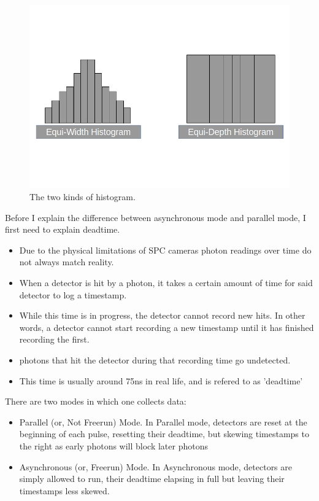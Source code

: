 \documentclass[aspectratio=169]{beamer}
\begin{document}
\begin{frame}
  \begin{figure}[H]
    \centering
    \includegraphics[width=0.75\linewidth]{Histograms.png}
    \caption{\label{fig:Data}\color{Blue}The two kinds of histogram.}
  \end{figure}
\end{frame}

\begin{frame}
  Before I explain the difference between asynchronous mode and parallel mode, I first need to explain deadtime.
  \begin{itemize}
    \color{Blue}
  \item Due to the physical limitations of SPC cameras photon readings over time do not always match reality.
  \item When a detector is hit by a photon, it takes a certain amount of time for said detector to log a timestamp.
  \item While this time is in progress, the detector cannot record new hits. In other words, a detector cannot start recording a new timestamp until it has finished recording the first.
  \item photons that hit the detector during that recording time go undetected.
  \item This time is usually around 75ns in real life, and is refered to as 'deadtime' \cite{sadekar}
  \end{itemize}
\end{frame}

\begin{frame}
  There are two modes in which one collects data: \cite{sadekar}
  \begin{itemize}
    \color{Blue}
  \item Parallel (or, Not Freerun) Mode. In Parallel mode, detectors are reset at the beginning of each pulse, resetting their deadtime, but skewing timestamps to the right as early photons will block later photons
  \item Asynchronous (or, Freerun) Mode. In Asynchronous mode, detectors are simply allowed to run, their deadtime elapsing in full but leaving their timestamps less skewed.
  \end{itemize}
\end{frame}
\end{document}
